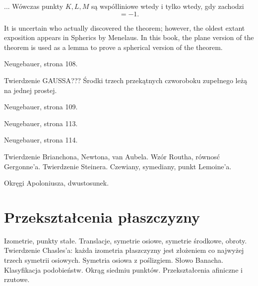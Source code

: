 \documentclass{parchment}
\begin{document}
\begin{proposition}
	...
	Wówczas punkty $K, L, M$ są współliniowe wtedy i tylko wtedy, gdy zachodzi
	\begin{equation}
		[AMB] [BKC] [CLA] = -1.
	\end{equation}
\end{proposition}

It is uncertain who actually discovered the theorem; however, the oldest extant exposition appears in Spherics by Menelaus. In this book, the plane version of the theorem is used as a lemma to prove a spherical version of the theorem.

\begin{proposition}
	Neugebauer, strona 108.
\end{proposition}

Twierdzenie GAUSSA???
Środki trzech przekątnych czworoboku zupełnego leżą na jednej prostej.

\begin{proposition}
	Neugebauer, strona 109.
\end{proposition}

\begin{proposition}
	Neugebauer, strona 113.
\end{proposition}

\begin{proposition}
	Neugebauer, strona 114.
\end{proposition}





Twierdzenie Brianchona, Newtona, van Aubela.
Wzór Routha, równosć Gergonne'a.
Twierdzenie Steinera.
Czewiany, symediany, punkt Lemoine'a.

Okręgi Apoloniusza, dwustosunek.


\chapter{Przekształcenia płaszczyzny}
Izometrie, punkty stałe.
Translacje, symetrie osiowe, symetrie środkowe, obroty.
Twierdzenie Chasles'a: każda izometria płaszczyzny jest złożeniem co najwyżej trzech symetrii osiowych.
Symetria osiowa z poślizgiem.
Słowo Banacha.
Klasyfikacja podobieństw.
Okrąg siedmiu punktów. %
Przekształcenia afiniczne i rzutowe.
\end{document}
